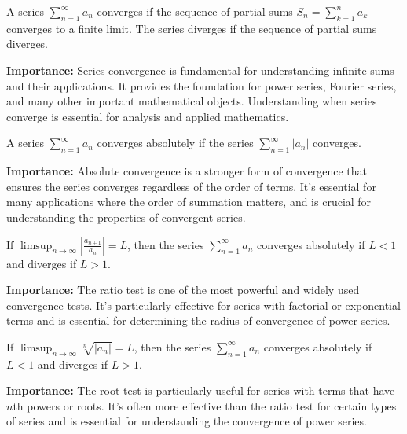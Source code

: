 \begin{definition}
A series $\sum_{n=1}^{\infty} a_n$ converges if the sequence of partial sums $S_n = \sum_{k=1}^n a_k$ converges to a finite limit. The series diverges if the sequence of partial sums diverges.
\end{definition}

\noindent\textbf{Importance:} Series convergence is fundamental for understanding infinite sums and their applications. It provides the foundation for power series, Fourier series, and many other important mathematical objects. Understanding when series converge is essential for analysis and applied mathematics.



\begin{definition}
A series $\sum_{n=1}^{\infty} a_n$ converges absolutely if the series $\sum_{n=1}^{\infty} |a_n|$ converges.
\end{definition}

\noindent\textbf{Importance:} Absolute convergence is a stronger form of convergence that ensures the series converges regardless of the order of terms. It's essential for many applications where the order of summation matters, and is crucial for understanding the properties of convergent series.



\begin{theorem}
If $\limsup_{n \to \infty} \left|\frac{a_{n+1}}{a_n}\right| = L$, then the series $\sum_{n=1}^{\infty} a_n$ converges absolutely if $L < 1$ and diverges if $L > 1$.
\end{theorem}

\noindent\textbf{Importance:} The ratio test is one of the most powerful and widely used convergence tests. It's particularly effective for series with factorial or exponential terms and is essential for determining the radius of convergence of power series.



\begin{theorem}
If $\limsup_{n \to \infty} \sqrt[n]{|a_n|} = L$, then the series $\sum_{n=1}^{\infty} a_n$ converges absolutely if $L < 1$ and diverges if $L > 1$.
\end{theorem}

\noindent\textbf{Importance:} The root test is particularly useful for series with terms that have $n$th powers or roots. It's often more effective than the ratio test for certain types of series and is essential for understanding the convergence of power series.



